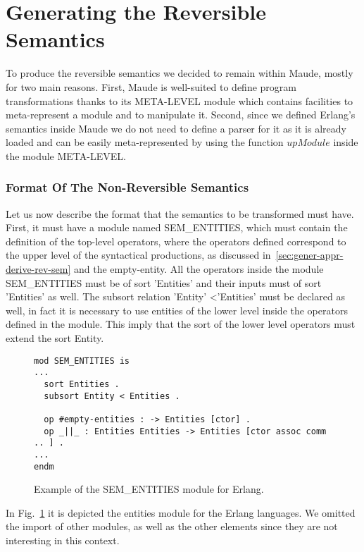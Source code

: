\documentclass{article}[12pt,a4paper]
\theoremstyle{definition}
\begin{document}
\section{Generating the Reversible Semantics}\label{sec:generating}

To produce the reversible semantics we decided to remain within Maude, mostly
for two main reasons. First, Maude is well-suited to define program transformations
thanks to its META-LEVEL module which contains facilities to meta-represent a
module and to manipulate it. Second, since we defined Erlang's semantics inside
Maude we do not need to define a parser for it as it is already loaded and can
be easily meta-represented by using the function $upModule$ inside the module
META-LEVEL.

\subsubsection{Format Of The Non-Reversible Semantics}
Let us now describe the format that the semantics to be transformed must have.
First, it must have a module named SEM_ENTITIES, which must contain the definition
of the top-level operators, where the operators defined correspond to the upper level
of the syntactical productions, as discussed
in~\ref{sec:gener-appr-derive-rev-sem} and the empty-entity.
All the operators inside the module SEM_ENTITIES must be of sort
'Entities' and their inputs must of sort 'Entities' as well. The subsort
relation 'Entity' \textless 'Entities' must be declared as well, in fact it is necessary
to use entities of the lower level inside the operators defined in the module.
This imply that the sort of the lower level operators must extend the sort
Entity.

\begin{figure}[t]
\begin{Verbatim}
mod SEM_ENTITIES is 
...
  sort Entities .
  subsort Entity < Entities .

  op #empty-entities : -> Entities [ctor] .
  op _||_ : Entities Entities -> Entities [ctor assoc comm .. ] .
...
endm
\end{Verbatim}
  \label{fig:sem-entities}
  \caption{Example of the SEM_ENTITIES module for Erlang.}
\end{figure}

In Fig.~\ref{fig:sem-entities} it is depicted the entities module for the Erlang
languages. We omitted the import of other modules, as well as the other elements
since they are not interesting in this context.
\end{document}
